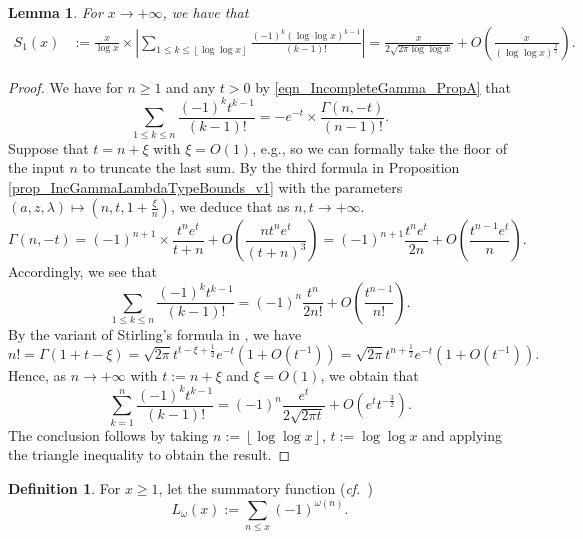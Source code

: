 \documentclass[11pt,reqno,a4letter]{article}
\newcommand{\hlocalref}[1]{\hyperref[#1]{\ref{#1}}}
\numberwithin{equation}{section}
\numberwithin{figure}{section}
\numberwithin{table}{section}
\newcommand{\cf}{\textit{cf.\ }}
\newcommand{\floor}[1]{\left\lfloor #1 \right\rfloor}
\theoremstyle{plain}
\newtheorem{lemma}[theorem]{Lemma}
\numberwithin{theorem}{section}
\theoremstyle{definition}
\newtheorem{definition}[theorem]{Definition}
\begin{document}
\begin{lemma}
\label{lemma_ConvenientIncGammaFuncTypePartialSumAsymptotics_v2}
For $x \rightarrow +\infty$, we have that 
\begin{align*}
S_1(x) & := \frac{x}{\log x} \times \left\lvert \sum_{1 \leq k \leq \floor{\log\log x}} 
     \frac{(-1)^k (\log\log x)^{k-1}}{(k-1)!} \right\rvert 
     = \frac{x}{2\sqrt{2\pi \log\log x}} + O\left(\frac{x}{(\log\log x)^{\frac{3}{2}}}\right). 
\end{align*}
\end{lemma}
\begin{proof}
We have for $n \geq 1$ and any $t > 0$ by 
\eqref{eqn_IncompleteGamma_PropA} that 
\[
\sum_{1 \leq k \leq n} \frac{(-1)^k t^{k-1}}{(k-1)!} = -e^{-t} \times 
     \frac{\Gamma(n, -t)}{(n-1)!}. 
\]
Suppose that $t = n + \xi$ with $\xi = O(1)$, e.g., so we can 
formally take the floor of the input $n$ to truncate the last sum. 
By the third formula 
in Proposition \hlocalref{prop_IncGammaLambdaTypeBounds_v1} 
with the parameters $(a, z, \lambda) \mapsto \left(n, t, 1 + \frac{\xi}{n}\right)$, 
we deduce that as $n,t \rightarrow +\infty$. 
\begin{equation}
\label{eqn_ProofTag_lemma_ConvenientIncGammaFuncTypePartialSumAsymptotics_v2}
\Gamma(n, -t) = (-1)^{n+1} \times \frac{t^n e^{t}}{t+n} + 
     O\left(\frac{n t^n e^{t}}{(t+n)^3}\right) = 
     (-1)^{n+1} \frac{t^n e^t}{2n} + O\left(\frac{t^{n-1} e^t}{n}\right). 
\end{equation}
Accordingly, we see that 
\[
\sum_{1 \leq k \leq n} \frac{(-1)^k t^{k-1}}{(k-1)!} = 
     (-1)^{n} \frac{t^n}{2n!} + O\left(\frac{t^{n-1}}{n!}\right). 
\]
By the variant of Stirling's formula in \cite[\cf Eq.\ (5.11.8)]{NISTHB}, we have 
\[
n! = \Gamma(1 + t - \xi) = \sqrt{2\pi} t^{t-\xi+\frac{1}{2}} e^{-t} \left(1 + O\left(t^{-1}\right)\right) = 
     \sqrt{2\pi} t^{n+\frac{1}{2}} e^{-t} \left(1 + O\left(t^{-1}\right)\right). 
\]
Hence, as $n \rightarrow +\infty$ with $t := n + \xi$ and $\xi = O(1)$, we obtain that 
\[
\sum_{k=1}^{n} \frac{(-1)^k t^{k-1}}{(k-1)!} = (-1)^n \frac{e^t}{2 \sqrt{2\pi t}} + 
     O\left(e^t t^{-\frac{3}{2}}\right). 
\]
The conclusion follows by taking $n := \floor{\log\log x}$, 
$t := \log\log x$ and applying the triangle inequality 
to obtain the result. 
\end{proof}

\begin{definition}
For $x \geq 1$, let the summatory function (\cf \cite{LUNE-DRESSLER}) 
\[
L_{\omega}(x) := \sum_{n \leq x} (-1)^{\omega(n)}. 
\]
\end{definition}
\end{document}
